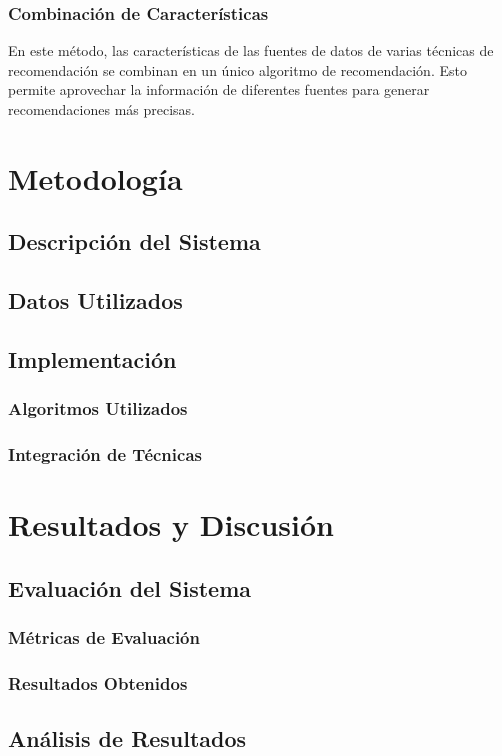 \documentclass[a4paper,12pt]{report}
\begin{document}
\subsection{Combinación de Características}
En este método, las características de las fuentes de datos de varias técnicas de recomendación se combinan en un único algoritmo de recomendación. Esto permite aprovechar la información de diferentes fuentes para generar recomendaciones más precisas.
\chapter{Metodología}
\section{Descripción del Sistema}
\section{Datos Utilizados}
\section{Implementación}
\subsection{Algoritmos Utilizados}
\subsection{Integración de Técnicas}

\chapter{Resultados y Discusión}
\section{Evaluación del Sistema}
\subsection{Métricas de Evaluación}
\subsection{Resultados Obtenidos}
\section{Análisis de Resultados}
\end{document}
